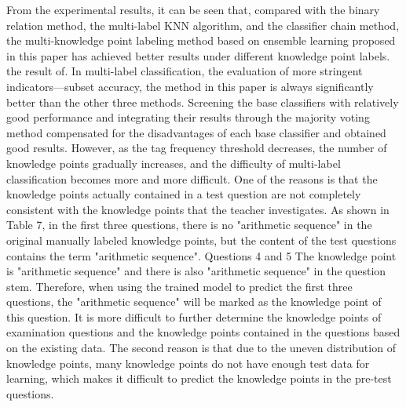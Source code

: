 From the experimental results, it can be seen that, compared with the binary relation method, the multi-label KNN algorithm, and the classifier chain method, the multi-knowledge point labeling method based on ensemble learning proposed in this paper has achieved better results under different knowledge point labels. the result of. In multi-label classification, the evaluation of more stringent indicators—subset accuracy, the method in this paper is always significantly better than the other three methods. Screening the base classifiers with relatively good performance and integrating their results through the majority voting method compensated for the disadvantages of each base classifier and obtained good results. However, as the tag frequency threshold decreases, the number of knowledge points gradually increases, and the difficulty of multi-label classification becomes more and more difficult. One of the reasons is that the knowledge points actually contained in a test question are not completely consistent with the knowledge points that the teacher investigates. As shown in Table 7, in the first three questions, there is no "arithmetic sequence" in the original manually labeled knowledge points, but the content of the test questions contains the term "arithmetic sequence". Questions 4 and 5 The knowledge point is "arithmetic sequence" and there is also "arithmetic sequence" in the question stem. Therefore, when using the trained model to predict the first three questions, the "arithmetic sequence" will be marked as the knowledge point of this question. It is more difficult to further determine the knowledge points of examination questions and the knowledge points contained in the questions based on the existing data. The second reason is that due to the uneven distribution of knowledge points, many knowledge points do not have enough test data for learning, which makes it difficult to predict the knowledge points in the pre-test questions.
